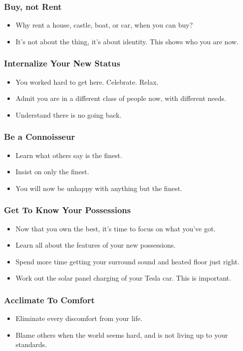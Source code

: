 \begin{frame}[fragile]\frametitle{Buy, not Rent}

\begin{itemize}
\item Why rent a house, castle, boat, or car, when you can buy?
\item It’s not about the thing, it’s about identity. This shows who you are now.
\end{itemize}

\end{frame}

\begin{frame}[fragile]\frametitle{Internalize Your New Status}

\begin{itemize}
\item You worked hard to get here. Celebrate. Relax.
\item Admit you are in a different class of people now, with different needs.
\item Understand there is no going back.
\end{itemize}

\end{frame}

\begin{frame}[fragile]\frametitle{Be a Connoisseur}

\begin{itemize}
\item Learn what others say is the finest.
\item Insist on only the finest.
\item You will now be unhappy with anything but the finest.
\end{itemize}

\end{frame}

\begin{frame}[fragile]\frametitle{Get To Know Your Possessions}

\begin{itemize}
\item Now that you own the best, it’s time to focus on what you’ve got.
\item Learn all about the features of your new possessions.
\item Spend more time getting your surround sound and heated floor just right.
\item Work out the solar panel charging of your Tesla car. This is important.
\end{itemize}

\end{frame}

\begin{frame}[fragile]\frametitle{Acclimate To Comfort}

\begin{itemize}
\item Eliminate every discomfort from your life.
\item Blame others when the world seems hard, and is not living up to your standards.
\end{itemize}

\end{frame}


